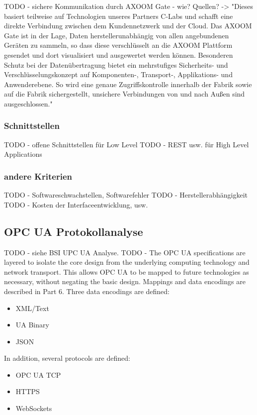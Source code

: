 \clearpage

TODO - sichere Kommunikation durch AXOOM Gate - wie? Quellen? -> "Dieses basiert teilweise auf Technologien unseres Partners C-Labs und schafft eine direkte Verbindung zwischen dem Kundennetzwerk und der Cloud. Das AXOOM Gate ist in der Lage, Daten herstellerunabhängig von allen angebundenen Geräten zu sammeln, so dass diese verschlüsselt an die AXOOM Plattform gesendet und dort visualisiert und ausgewertet werden können. Besonderen Schutz bei der Datenübertragung bietet ein mehrstufiges Sicherheits- und Verschlüsselungskonzept auf Komponenten-, Transport-, Applikations- und Anwenderebene. So wird eine genaue Zugriffskontrolle innerhalb der Fabrik sowie auf die Fabrik sichergestellt, unsichere Verbindungen von und nach Außen sind ausgeschlossen."

\subsubsection{Schnittstellen}
TODO - offene Schnittstellen für Low Level
TODO - REST usw. für High Level Applications

\subsubsection{andere Kriterien}
TODO - Softwareschwachstellen, Softwarefehler 
TODO - Herstellerabhängigkeit
TODO - Kosten der Interfaceentwicklung, usw.

\subsection{\ac{OPC UA} Protokollanalyse}
TODO - siehe BSI UPC UA Analyse.
TODO - The OPC UA specifications are layered to isolate the core design from the underlying computing technology and network transport. This allows OPC UA to be mapped to future technologies as necessary, without negating the basic design. Mappings and data encodings are described in Part 6. Three data encodings are defined:
\begin{itemize}
    \item XML/Text
    \item UA Binary
    \item JSON
\end{itemize}
In addition, several protocols are defined:
\begin{itemize}
    \item OPC UA TCP
    \item HTTPS
    \item WebSockets
\end{itemize}

